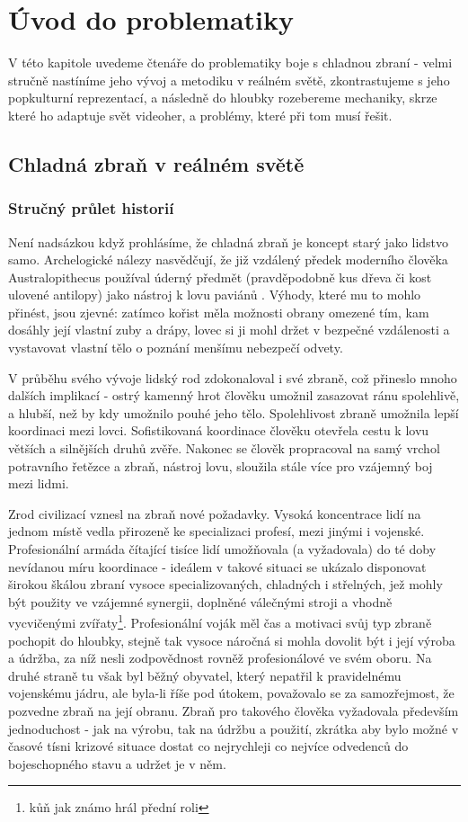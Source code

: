 \chapter{Úvod do problematiky}
V této kapitole uvedeme čtenáře do problematiky boje s chladnou zbraní - velmi stručně nastíníme jeho vývoj a metodiku v reálném světě, zkontrastujeme s jeho popkulturní reprezentací, a následně do hloubky rozebereme mechaniky, skrze které ho adaptuje svět videoher, a problémy, které při tom musí řešit.


\section{Chladná zbraň v reálném světě}
\subsection{Stručný průlet historií}
Není nadsázkou když prohlásíme, že chladná zbraň je koncept starý jako lidstvo samo. Archelogické nálezy nasvědčují, že již vzdálený předek moderního člověka Australopithecus používal úderný předmět (pravděpodobně kus dřeva či kost ulovené antilopy) jako nástroj k lovu paviánů \cite{AustralopithecusWeapon}. Výhody, které mu to mohlo přinést, jsou zjevné: zatímco kořist měla možnosti obrany omezené tím, kam dosáhly její vlastní zuby a drápy, lovec si ji mohl držet v bezpečné vzdálenosti a vystavovat vlastní tělo o poznání menšímu nebezpečí odvety.

V průběhu svého vývoje lidský rod zdokonaloval i své zbraně, což přineslo mnoho dalších implikací - ostrý kamenný hrot člověku umožnil zasazovat ránu spolehlivě, a hlubší, než by kdy umožnilo pouhé jeho tělo. Spolehlivost zbraně umožnila lepší koordinaci mezi lovci. Sofistikovaná koordinace člověku otevřela cestu k lovu větších a silnějších druhů zvěře. Nakonec se člověk propracoval na samý vrchol potravního řetězce a zbraň, nástroj lovu, sloužila stále více pro vzájemný boj mezi lidmi. 

Zrod civilizací vznesl na zbraň nové požadavky. Vysoká koncentrace lidí na jednom místě vedla přirozeně ke specializaci profesí, mezi jinými i vojenské. Profesionální armáda čítající tisíce lidí umožňovala (a vyžadovala) do té doby nevídanou míru koordinace - ideálem v takové situaci se ukázalo disponovat širokou škálou zbraní vysoce specializovaných, chladných i střelných, jež mohly být použity ve vzájemné synergii, doplněné válečnými stroji a vhodně vycvičenými zvířaty\footnote{kůň jak známo hrál přední roli}. Profesionální voják měl čas a motivaci svůj typ zbraně pochopit do hloubky, stejně tak vysoce náročná si mohla dovolit být i její výroba a údržba, za níž nesli zodpovědnost rovněž profesionálové ve svém oboru. 
Na druhé straně tu však byl běžný obyvatel, který nepatřil k pravidelnému vojenskému jádru, ale byla-li říše pod útokem, považovalo se za samozřejmost, že pozvedne zbraň na její obranu. Zbraň pro takového člověka vyžadovala především jednoduchost - jak na výrobu, tak na údržbu a použití, zkrátka aby bylo možné v časové tísni krizové situace dostat co nejrychleji co nejvíce odvedenců do bojeschopného stavu a udržet je v něm.

